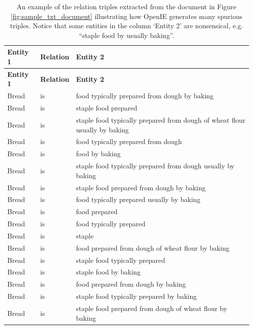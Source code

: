 \documentclass[12pt]{article}
\theoremstyle{grammarstyle}
\begin{document}
\begin{longtable}{|l|l|p{8cm}|} 
    \caption{An example of the relation triples extracted from the document in Figure \ref{fig:sample_txt_document} illustrating how OpenIE generates many spurious triples. Notice that some entities in the column `Entity 2' are nonsensical, e.g. ``staple food by usually baking''.} 
    \label{tab:openie_example} \\
    \hline
    \textbf{Entity 1} & \textbf{Relation} & \textbf{Entity 2} \\
    \hline
    \endfirsthead
    
    \hline
    \textbf{Entity 1} & \textbf{Relation} & \textbf{Entity 2} \\
    \hline
    \endhead
    Bread    &	is	&    food typically prepared from dough by baking \\
    \hline
    Bread    &	is	&    staple food prepared \\
    \hline
    Bread    &	is	&    staple food typically prepared from dough of wheat flour usually by baking \\
    \hline
    Bread    &	is	&    food typically prepared from dough \\
    \hline
    Bread    &	is &    food by	baking \\
    \hline
    Bread    &	is	&    staple food typically prepared from dough usually by baking \\
    \hline
    Bread    &	is	&    staple food prepared from dough by baking \\
    \hline
    Bread    &	is	&    food typically prepared usually by baking \\
    \hline
    Bread    &	is	&    food prepared \\
    \hline
    Bread    &	is	&    food typically prepared \\
    \hline
    Bread    &	is	&    staple \\
    \hline
    Bread    &	is	&    food prepared from dough of wheat flour by baking \\
    \hline
    Bread    &	is	&    staple food typically prepared \\
    \hline
    Bread    &	is &    staple food by	baking \\
    \hline
    Bread    &	is	&    food prepared from dough by baking \\
    \hline
    Bread    &	is	&    staple food typically prepared by baking \\
    \hline
    Bread    &	is	&    staple food prepared from dough of wheat flour by baking \\

\end{longtable}
\end{document}
